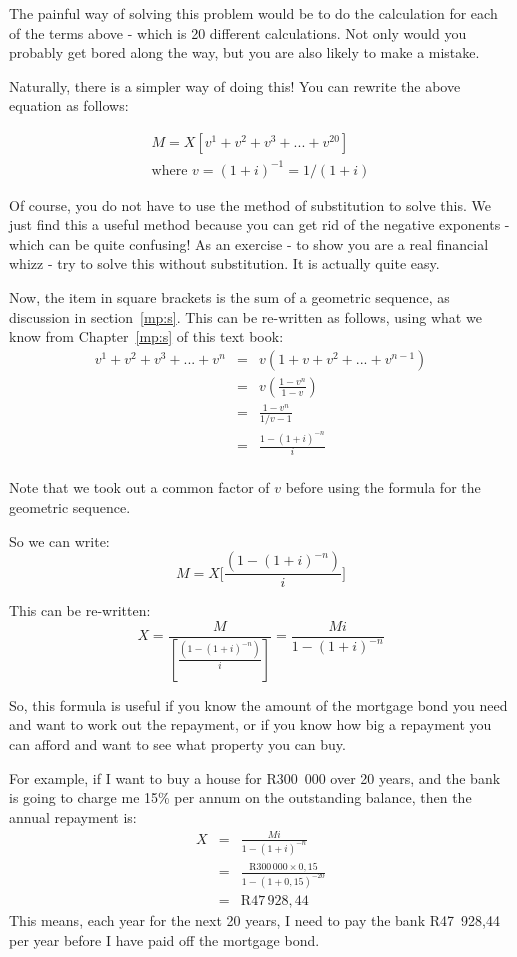 The painful way of solving this problem would be to do the calculation for each of the terms above - which is 20 different calculations. Not only would you probably get bored along the way, but you are also likely to make a mistake.

Naturally, there is a simpler way of doing this! You can rewrite the above equation as follows:

\begin{eqnarray*}
M = X[v^1 + v^2 + v^3 + ... + v^{20}]\\
\mbox{where $v = (1+i)^{-1} = 1/(1+i)$}
\end{eqnarray*}

Of course, you do not have to use the method of substitution to solve this. We just find this a useful method because you can get rid of the negative exponents - which can be quite confusing! As an exercise - to show you are a real financial whizz - try to solve this without substitution. It is actually quite easy.

Now, the item in square brackets is the sum of a geometric sequence, as discussion in section~\ref{mp:s}. This can be re-written as follows, using what we know from Chapter~\ref{mp:s} of this text book:
\begin{eqnarray*}
v^1 + v^2 + v^3 + ... + v^n &=& v(1 + v + v^2 + ... + v^{n-1})\\
&=& v\left(\frac{1 - v^n}{1-v}\right)\\
&=& \frac{1 - v^n}{1/v-1}\\
&=& \frac{1-(1+i)^{-n}}{i}\\
\end{eqnarray*}

Note that we took out a common factor of $v$ before using the formula for the geometric sequence.

So we can write:
\begin{equation*}
M = X \biggl[\frac{(1-(1+i)^{-n})}{i}\biggr]
\end{equation*}

This can be re-written:
\begin{equation*}
X = \frac{M}{[\frac{(1-(1+i)^{-n})}{i}]} = \frac{Mi}{1-(1+i)^{-n}}
\end{equation*}

So, this formula is useful if you know the amount of the mortgage bond you need and want to work out the repayment, or if you know how big a repayment you can afford and want to see what property you can buy.

For example, if I want to buy a house for R300~000 over 20 years, and the bank is going to charge me 15\% per annum on the outstanding balance, then the annual repayment is:
\begin{eqnarray*}
X &=& \frac{Mi}{1-(1+i)^{-n}}\\
&=& \frac{\mbox{R}300\,000 \times 0,15}{1-(1+0,15)^{-20}}\\
&=& \mbox{R}47\,928,44
\end{eqnarray*}
This means, each year for the next 20 years, I need to pay the bank R47~928,44 per year before I have paid off the mortgage bond. 


